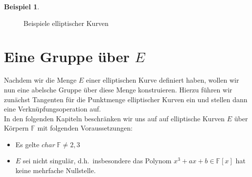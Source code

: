 \documentclass[hidelinks]{article}
\theoremstyle{plain}
\theoremstyle{definition}
\newtheorem{bsp}[thm]{Beispiel}
\theoremstyle{rem}
\begin{document}
\begin{sloppypar}
\begin{bsp}
\begin{figure}[H]
{}
        \qquad
        \caption{Beispiele elliptischer Kurven}
	\label{fig:elliptic-curves}
    \end{figure}
\end{bsp}


\section{Eine Gruppe über $E$}
Nachdem wir die Menge $E$ einer elliptischen Kurve definiert haben, wollen wir nun eine abelsche Gruppe über diese Menge konstruieren. Hierzu führen wir zunächst Tangenten für die Punktmenge elliptischer Kurven ein und stellen dann eine Verknüpfungsoperation auf.\\

In den folgenden Kapiteln beschränken wir uns auf auf elliptische Kurven $E$ über Körpern $\mathbb{F}$ mit folgenden Voraussetzungen:
\begin{itemize}
	\item Es gelte $char\ \mathbb{F}\ne2,3$
	\item $E$ sei nicht singulär, d.h.\ insbesondere das Polynom $x^3+ax+b\in\mathbb{F}[x]$ hat keine mehrfache Nullstelle.
\end{itemize}


\end{sloppypar}
\end{document}
